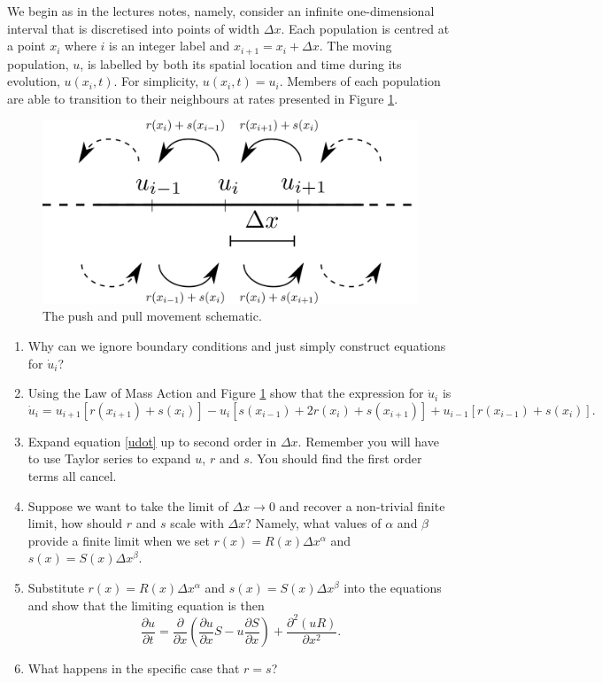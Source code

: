 \documentclass[10pt]{article}
\newcommand{\bb}{\begin{equation}}
\newcommand{\ee}{\end{equation}}
\newcommand{\D}[2]{\frac{\partial #1}{\partial #2}}
\newcommand{\DD}[2]{\frac{\partial^2 #1}{\partial #2^2}}
\newcommand{\fig}[1]{Figure \ref{#1}}
\newcommand{\eqn}[1]{equation \eqref{#1}}
\newcommand{\tp}{.8\textwidth}
\renewcommand{\l}{\left(}
\renewcommand{\r}{\right)}
\begin{document}
We begin as in the lectures notes, namely, consider an infinite one-dimensional interval that is discretised into points of width $\Delta x$. Each population is centred at a point $x_i$ where $i$ is an integer label and $x_{i+1}=x_i+\Delta x$. The moving population, $u$, is labelled by both its spatial location and time during its evolution, $u(x_i,t)$.  For simplicity, $u(x_i,t)=u_i$.  Members of each population are able to transition to their neighbours at rates presented in \fig{Push_pull_taxis}. 
\begin{figure}[h!!!tb]
\centering
\includegraphics[width=\tp]{../../Pictures/Push_pull_taxis.png}
\caption{The push and pull movement schematic. \label{Push_pull_taxis}}
\end{figure}

\begin{enumerate}
\item Why can we ignore boundary conditions and just simply construct equations for $\dot{u}_i$?

\item Using the Law of Mass Action and \fig{Push_pull_taxis} show that the expression for $\dot{u}_i$ is
\bb
\dot{u}_i=u_{i+1}[ r(x_{i+1})+s(x_i) ]-u_i[ s(x_{i-1})+2r(x_i)+s(x_{i+1})]+u_{i-1}[ r(x_{i-1})+s(x_i) ].\label{udot}
\ee

\item Expand \eqn{udot} up to second order in $\Delta x$. Remember you will have to use Taylor series to expand $u$, $r$ and $s$. You should find the first order terms all cancel.

\item Suppose we want to take the limit of $\Delta x\rightarrow 0$ and recover a non-trivial finite limit, how should $r$ and $s$ scale with $\Delta x$? Namely, what values of $\alpha$ and $\beta$ provide a finite limit when we set $r(x)=R(x)\Delta x^\alpha$ and $s(x)=S(x)\Delta x^\beta$.

\item Substitute $r(x)=R(x)\Delta x^\alpha$ and $s(x)=S(x)\Delta x^\beta$ into the equations and show that the limiting equation is then
\bb
\D{u}{t}=\D{}{x}\l\D{u}{x}S-u\D{S}{x}\r+\DD{\l uR\r}{x}.
\ee
\item What happens in the specific case that $r=s$?
\end{enumerate}
\end{document}
